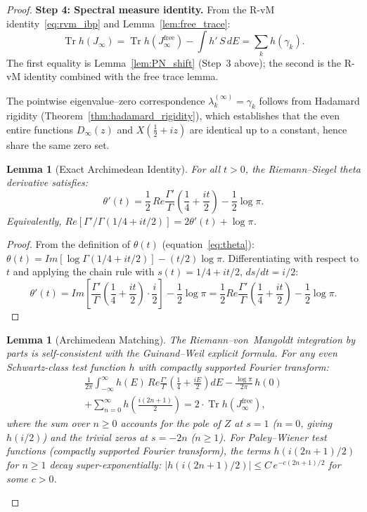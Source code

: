 \documentclass{pre-aomart}
\def\Re{Re}%
\def\Im{Im}%
\def\zeta{Z}%
\def\xi{X}%
\theoremstyle{plain}
\newtheorem{lemma}[theorem]{Lemma}
\theoremstyle{definition}
\theoremstyle{remark}
\begin{document}
\begin{proof}
\textbf{Step 4: Spectral measure identity.}
From the R-vM identity~\eqref{eq:rvm_ibp} and
Lemma~\ref{lem:free_trace}:
\begin{equation}\label{eq:trace_identity}
\operatorname{Tr} h(J_\infty)
= \operatorname{Tr} h(J_\infty^{\mathrm{free}}) - \int h'\,S\,dE
= \sum_k h(\gamma_k).
\end{equation}
The first equality is Lemma~\ref{lem:PN_shift} (Step~3 above);
the second is the R-vM identity combined with the free trace lemma.

The pointwise eigenvalue--zero correspondence
$\lambda_k^{(\infty)} = \gamma_k$ follows from Hadamard rigidity
(Theorem~\ref{thm:hadamard_rigidity}),
which establishes that the even entire functions
$D_\infty(z)$ and $\xi(\tfrac12+iz)$ are identical up to a constant,
hence share the same zero set.

\begin{lemma}[Exact Archimedean Identity]\label{lem:archimedean_exact}
For all $t > 0$, the Riemann--Siegel theta derivative satisfies:
\[
\theta'(t) = \frac{1}{2}\,\Re\frac{\Gamma'}{\Gamma}\!\left(\frac{1}{4}+\frac{it}{2}\right)
            - \frac{1}{2}\log\pi.
\]
Equivalently, $\Re[\Gamma'/\Gamma(1/4+it/2)] = 2\theta'(t) + \log\pi$.
\end{lemma}

\begin{proof}
From the definition of $\theta(t)$ (equation~\eqref{eq:theta}):
$\theta(t) = \Im[\log\Gamma(1/4+it/2)] - (t/2)\log\pi$.
Differentiating with respect to $t$ and applying the chain rule
with $s(t) = 1/4 + it/2$, $ds/dt = i/2$:
\[
\theta'(t) = \Im\!\left[\frac{\Gamma'}{\Gamma}\!\left(\frac{1}{4}+\frac{it}{2}\right)\cdot\frac{i}{2}\right]
            - \frac{1}{2}\log\pi
          = \frac{1}{2}\Re\frac{\Gamma'}{\Gamma}\!\left(\frac{1}{4}+\frac{it}{2}\right)
            - \frac{1}{2}\log\pi.
\]
\end{proof}

\begin{lemma}[Archimedean Matching]\label{lem:archimedean}
The Riemann--von~Mangoldt integration by parts is self-consistent with the
Guinand--Weil explicit formula.  For any even Schwartz-class test function $h$
with compactly supported Fourier transform:
\begin{multline*}
\frac{1}{2\pi}\int_{-\infty}^{\infty} h(E)\,\Re\frac{\Gamma'}{\Gamma}
  \!\left(\frac14+\frac{iE}{2}\right)dE
  - \frac{\log\pi}{2\pi}\,h(0) \\
  + \sum_{n=0}^{\infty} h\!\left(\frac{i(2n+1)}{2}\right)
  = 2\cdot\operatorname{Tr} h(J_\infty^{\mathrm{free}}),
\end{multline*}
where the sum over $n \ge 0$ accounts for the pole of $\zeta$ at $s=1$
($n=0$, giving $h(i/2)$) and the trivial zeros at $s=-2n$ ($n \ge 1$).
For Paley--Wiener test functions (compactly supported Fourier transform),
the terms $h(i(2n+1)/2)$ for $n \ge 1$ decay super-exponentially:
$|h(i(2n+1)/2)| \le C\,e^{-c(2n+1)/2}$ for some $c > 0$.
\end{lemma}


\end{proof}
\end{document}
